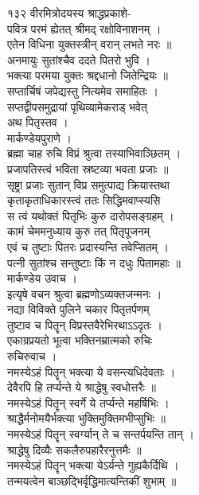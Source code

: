 \documentclass[11pt, openany]{book}
\begin{document}
{{{{{{{{{{{{{{{{{{{{{{{१३२ }{ वीरमित्रोदयस्य श्राद्धप्रकाशे-}{\\
पवित्र परमं ह्येतत् श्रीमद् रक्षोविनाशनम् ।\\
एतेन विधिना युक्तस्त्रीन् वरान् लभते नरः ॥\\
अनमायुः सुतांश्चैव ददते पितरो भुवि ।\\
भक्त्या परमया युक्तः श्रद्दधानो जितेन्द्रियः ॥\\
सप्तार्चिषं जपेद्यस्तु नित्यमेव समाहितः ।\\
सप्तद्वीपसमुद्रायां पृथिव्यामेकराड् भवेत् \textbar{}\textbar{}\\
अथ पितृस्तव ।\\
मार्कण्डेयपुराणे ।\\
ब्रह्मा चाह रुचि विप्रं श्रुत्वा तस्याभिवाञ्छितम् ।\\
प्रजापतिस्त्वं भविता स्रष्टव्या भवता प्रजाः ॥\\
सृष्ट्रा प्रजाः सुतान् विप्र समुत्पाद्य क्रियास्तथा \textbar{}\\
कृताकृताधिकारस्त्वं ततः सिद्धिमवाप्स्यसि \textbar{}\textbar{}\\
स त्वं यथोक्तं पितृभिः कुरु दारोपसङ्ग्रहम् ।\\
कामं चेममनुध्याय कुरु तत् पितृपूजनम् \textbar{}\textbar{}\\
एवं च तुष्टाः पितरः प्रदास्यन्ति तवेप्सितम् ।\\
पत्नी सुतांश्च सन्तुष्टाः किं न दधुः पितामहाः ॥\\
मार्कण्डेय उवाच ।\\
इत्यृषे वचन श्रुत्वा ब्रह्मणोऽव्यक्तजन्मनः ।\\
नद्या विविक्ते पुलिने चकार पितृतर्पणम् \textbar{}\textbar{}\\
तुष्टाव च पितॄन् विप्रस्तवैरेभिरथाऽऽदृतः ।\\
एकाग्रप्रयतो भूत्वा भक्तिनम्रात्मको रुचिः \textbar{}\textbar{}\\
रुचिरुवाच ।\\
नमस्येऽहं पितॄन् भक्त्या ये वसन्त्यधिदेवताः ।\\
देवैरपि हि तर्प्यन्ते ये श्राद्धेषु स्वधोत्तरैः ॥\\
नमस्येऽहं पितॄन् स्वर्गे ये तर्प्यन्ते महर्षिभिः ।\\
श्राद्धैर्मनोमयैर्भक्त्या भुक्तिमुक्तिमभीप्सुभिः ॥\\
नमस्येऽहं पितॄन् स्वर्ग्यान् ते च सन्तर्पयन्ति तान् ।\\
श्राद्धेषु दिव्यैः सकलैरुपहारैरनुत्तमैः ॥\\
नमस्येऽहं पितॄन् भक्त्या येऽर्यन्ते गुह्यकैर्दिथि ।\\
तन्मयत्वेन बाञ्छद्भिर्वृद्धिमात्यन्तिकीं शुभाम् ॥\\


}}}}}}}}}}}}}}}}}}}}}}}
\end{document}
